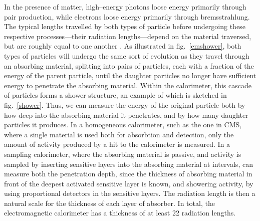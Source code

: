 In the presence of matter, high--energy photons loose energy primarily through pair production, while electrons loose energy primarily through bremsstrahlung. The typical lengths travelled by both types of particle before undergoing these respective processes---their radiation lengths---depend on the material traversed, but are roughly equal to one another \cite{fernow:sampcal}. As illustrated in fig.~\ref{emshower}, both types of particles will undergo the same sort of evolution as they travel through an absorbing material, splitting into pairs of particles, each with a fraction of the energy of the parent particle, until the daughter particles no longer have sufficient energy to penetrate the absorbing material. Within the calorimeter, this cascade of particles forms a shower structure, an example of which is sketched in fig.~\ref{shower}. Thus, we can measure the energy of the original particle both by how deep into the absorbing material it penetrates, and by how many daughter particles it produces. In a homogeneous calorimeter, such as the one in CMS, where a single material is used both for absorbtion and detection, only the amount of activity produced by a hit to the calorimeter is measured. In a sampling calorimeter, where the absorbing material is passive, and activity is sampled by inserting sensitive layers into the absorbing material at intervals, can measure both the penetration depth, since the thickness of absorbing material in front of the deepest activated sensitive layer is known, and showering activity, by using proportional detectors in the sensitive layers. The radiation length is then a natural scale for the thickness of each layer of absorber. In total, the electromagnetic calorimeter has a thickness of at least 22 radiation lengths.

